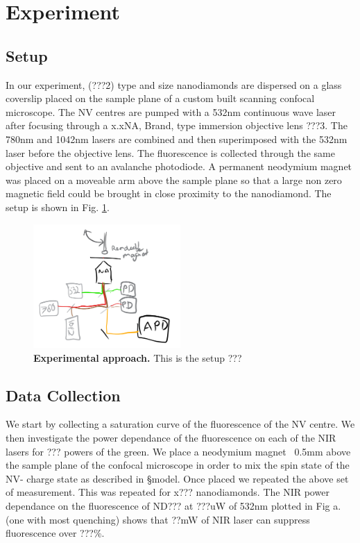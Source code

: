 \documentclass[preprint,prl]{revtex4}
\begin{document}
\section{Experiment}
\subsection{Setup}
In our experiment, (???2) type and size nanodiamonds are dispersed on a glass coverslip placed on the sample plane of a custom built scanning confocal microscope. The NV centres are pumped with a 532nm continuous wave laser after focusing through a x.xNA, Brand, type immersion objective lens ???3. The 780nm and 1042nm lasers are combined and then superimposed with the 532nm laser before the objective lens. The fluorescence is collected through the same objective and sent to an avalanche photodiode. A permanent neodymium magnet was placed on a moveable arm above the sample plane so that a large non zero magnetic field could be brought in close proximity to the nanodiamond. The setup is shown in Fig. \ref{FigSetup}.

\begin{figure}[t]
  \centering
  \includegraphics[width=0.5\textwidth]{Setup.png} 
 \caption{\textbf{Experimental approach.} This is the setup ???} \label{FigSetup}
\end{figure}

\subsection{Data Collection}
We start by collecting a saturation curve of the fluorescence of the NV centre. We then investigate the power dependance of the fluorescence on each of the NIR lasers for ??? powers of the green. We place a neodymium magnet ~0.5mm above the sample plane of the confocal microscope in order to mix the spin state of the NV- charge state as described in \S model. Once placed we repeated the above set of measurement. This was repeated for x??? nanodiamonds. The NIR power dependance on the fluorescence of ND??? at ???uW of 532nm plotted in Fig a. (one with most quenching) shows that ??mW of NIR laser can suppress fluorescence over ???\%.
\end{document}
